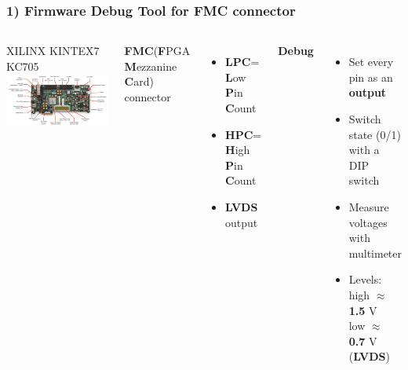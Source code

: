 \documentclass[aspectratio=169]{beamer}
\begin{document}
	\begin{frame}
		\frametitle{1) Firmware Debug Tool for FMC connector}
		\begin{columns}
			\begin{center}
				{\color{blue} XILINX KINTEX7 KC705}
				\includegraphics[width=1.0 \textwidth]{IMG/KC705.PNG}
			\end{center}
			\textbf{FMC}{\tiny (\textbf{F}PGA \textbf{M}ezzanine \textbf{C}ard)} connector
			\begin{itemize}
				\item \textbf{LPC}= \textbf{L}ow \textbf{P}in \textbf{C}ount
				\item \textbf{HPC}= \textbf{H}igh \textbf{P}in \textbf{C}ount
				\item \textbf{LVDS} output 
			\end{itemize}
			\textbf{Debug}
			\begin{itemize}
				\item Set every pin as an \textbf{output}
				\item Switch state (0/1) with a DIP switch
				\item Measure voltages with multimeter
				\item Levels: high $\approx$ \textbf{1.5} V \\ low $\approx$ \textbf{0.7} V (\textbf{LVDS})
			\end{itemize}
		\end{columns}
	\end{frame}
\end{document}
